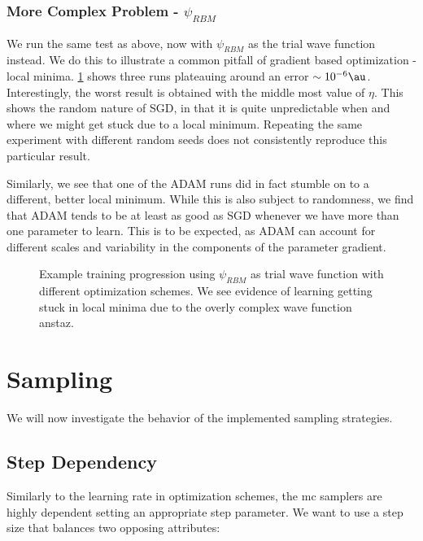\documentclass[Thesis.tex]{subfiles}
\begin{document}
\subsubsection{More Complex Problem - $\psi_{RBM}$}

We run the same test as above, now with $\psi_{RBM}$ as the trial wave function
instead. We do this to illustrate a common pitfall of gradient based
optimization - local minima. \cref{fig:verify-lr-rbm} shows three runs
plateauing around an error $\sim 10^{-6}\si{\au}$. Interestingly, the worst
result is obtained with the middle most value of $\eta$. This shows the random
nature of SGD, in that it is quite unpredictable when and where we might get
stuck due to a local minimum. Repeating the same experiment with different random
seeds does not consistently reproduce this particular result.

Similarly, we see that one of the ADAM runs did in fact stumble on to a
different, better local minimum. While this is also subject to randomness, we
find that ADAM tends to be at least as good as SGD whenever we have more than
one parameter to learn. This is to be expected, as ADAM can account for
different scales and variability in the components of the parameter gradient.

\begin{figure}[h]
  \centering
    \resizebox{\linewidth}{!}{%
      
    }
  \caption[Comparison of optimization schemes on a complicated problem]{\label{fig:verify-lr-rbm}Example training progression using
    $\psi_{RBM}$ as trial wave function with different optimization schemes. We
    see evidence of learning getting stuck in local minima due to the overly
    complex wave function anstaz.}
\end{figure}


\section{Sampling}
\label{sec:verify-sampling}

We will now investigate the behavior of the implemented sampling strategies.

\subsection{Step Dependency}

Similarly to the learning rate in optimization schemes, the \gls{mc} samplers
are highly dependent setting an appropriate step parameter. We want to use a
step size that balances two opposing attributes:
\end{document}
